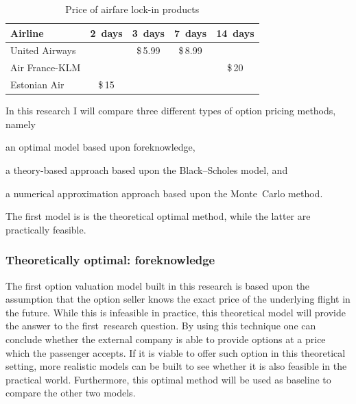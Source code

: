 \begin{table}[ht]
	\centering
	\begin{tabular}{l  c  c  c  c}
	\toprule
	Airline         & 2~days & 3~days  & 7~days  & 14~days \\
    \midrule
	United Airways  &        & \$\,5.99 & \$\,8.99 & 	       \\
	Air France-KLM  &        &         &         & \$\,20   \\
	Estonian Air    & \$\,15   &         &         &         \\
	\bottomrule
	\end{tabular}
	\caption{Price of airfare lock-in products}
	\label{tbl:PriceOfAirfareLockIn}
\end{table}

In this research I will compare three different types of option pricing methods, name\-ly \begin{inparaenum}
\item an optimal model based upon foreknowledge,
\item a theory-based approach based upon the Black--Scholes model, and
\item a numerical approximation approach based upon the Monte~Carlo method.
\end{inparaenum} The first model is is the theoretical optimal method, while the latter are practically feasible.

\subsubsection{Theoretically optimal: foreknowledge}
The first option valuation model built in this research is based upon the assumption that the option seller knows the exact price of the underlying flight in the future. While this is infeasible in practice, this theoretical model will provide the answer to the first~research question. By using this technique one can conclude whether the external company is able to provide options at a price which the passenger accepts. If it is viable to offer such option in this theoretical setting, more realistic models can be built to see whether it is also feasible in the practical world. Furthermore, this optimal method will be used as baseline to compare the other two models. 

